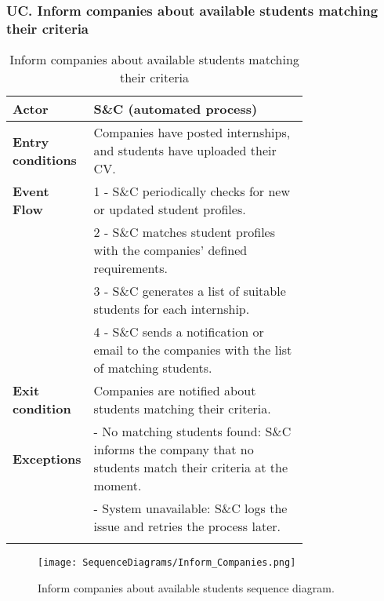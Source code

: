 \subsubsection*{UC\cuc . Inform companies about available students matching their criteria}
\begin{center}
    \begin{longtable}{|l|p{0.75\linewidth}|}
        \hline
        \textbf{Actor}            & S\&C (automated process) \\
        \hline
        \textbf{Entry conditions} & Companies have posted internships, and students have uploaded their CV. \\
        \hline
        \textbf{Event Flow}       & 1 - S\&C periodically checks for new or updated student profiles. \\
        & 2 - S\&C matches student profiles with the companies' defined requirements. \\
        & 3 - S\&C generates a list of suitable students for each internship. \\
        & 4 - S\&C sends a notification or email to the companies with the list of matching students. \\
        \hline
        \textbf{Exit condition}   & Companies are notified about students matching their criteria. \\       
        \hline
        \textbf{Exceptions}       & - No matching students found: S\&C informs the company that no students match their criteria at the moment. \\
                                  & - System unavailable: S\&C logs the issue and retries the process later.\\
        \hline
        \caption{Inform companies about available students matching their criteria}
        \label{tab:inform_companies_usecase}
    \end{longtable}
\end{center}

\begin{figure}[H]
    \begin{center}
        \texttt{[image: SequenceDiagrams/Inform\_Companies.png]}
        \caption{Inform companies about available students sequence diagram.}
        \label{fig:inform_companies_seqd}%
    \end{center}
\end{figure}


